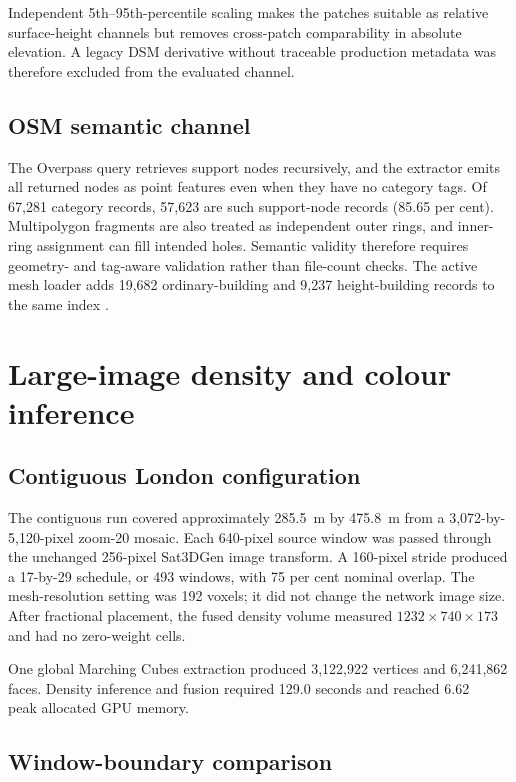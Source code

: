 Independent 5th--95th-percentile scaling makes the patches suitable as relative
surface-height channels but removes cross-patch comparability in absolute
elevation.  A legacy DSM derivative without traceable production metadata was
therefore excluded from the evaluated channel.

\subsection{OSM semantic channel}

The Overpass query retrieves support nodes recursively, and the extractor emits
all returned nodes as point features even when they have no category tags.  Of
67,281 category records, 57,623 are such support-node records (85.65 per cent).
Multipolygon fragments are also treated as
independent outer rings, and inner-ring assignment can fill intended holes.
Semantic validity therefore requires geometry- and tag-aware validation rather
than file-count checks.
The active mesh loader adds 19,682 ordinary-building and 9,237 height-building
records to the same index
\cite{openstreetmapData}.

\section{Large-image density and colour inference}
\label{sec:large-image-results}

\subsection{Contiguous London configuration}

The contiguous run covered approximately \SI{285.5}{\metre} by
\SI{475.8}{\metre} from a 3,072-by-5,120-pixel zoom-20 mosaic.  Each
640-pixel source window was passed through the unchanged 256-pixel Sat3DGen
image transform.  A 160-pixel stride produced a 17-by-29 schedule, or 493
windows, with 75 per cent nominal overlap.  The mesh-resolution setting was
192 voxels; it did not change the network image size.  After fractional
placement, the fused density volume measured $1232\times740\times173$ and had
no zero-weight cells.

One global Marching Cubes extraction produced 3,122,922 vertices and 6,241,862
faces.  Density inference and fusion required 129.0 seconds and reached
\SI{6.62}{\gibi\byte} peak allocated GPU memory.

\subsection{Window-boundary comparison}

